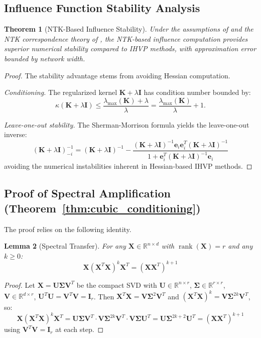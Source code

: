 \documentclass{article}
\theoremstyle{plain}
\newtheorem{theorem}{Theorem}[section]
\newtheorem{lemma}[theorem]{Lemma}
\theoremstyle{definition}
\theoremstyle{remark}
\newcommand{\R}{\mathbb{R}}
\begin{document}
\subsection{Influence Function Stability Analysis}

\begin{theorem}[NTK-Based Influence Stability]
Under the assumptions of \citet{zhang2022rethinking} and the NTK correspondence theory of \citet{jacot2018neural,lee2019wide}, the NTK-based influence computation provides superior numerical stability compared to IHVP methods, with approximation error bounded by network width.
\end{theorem}

\begin{proof}
The stability advantage stems from avoiding Hessian computation.

\textit{Conditioning.} The regularized kernel $\mathbf{K} + \lambda \mathbf{I}$ has condition number bounded by:
$$\kappa(\mathbf{K} + \lambda \mathbf{I}) \leq \frac{\lambda_{\max}(\mathbf{K}) + \lambda}{\lambda} = \frac{\lambda_{\max}(\mathbf{K})}{\lambda} + 1.$$

\textit{Leave-one-out stability.} The Sherman-Morrison formula yields the leave-one-out inverse:
$$(\mathbf{K} + \lambda \mathbf{I})^{-1}_{-i} = (\mathbf{K} + \lambda \mathbf{I})^{-1} - \frac{(\mathbf{K} + \lambda \mathbf{I})^{-1} \mathbf{e}_i \mathbf{e}_i^T (\mathbf{K} + \lambda \mathbf{I})^{-1}}{1 + \mathbf{e}_i^T (\mathbf{K} + \lambda \mathbf{I})^{-1} \mathbf{e}_i}$$
avoiding the numerical instabilities inherent in Hessian-based IHVP methods.
\end{proof}

\subsection{Proof of Spectral Amplification (Theorem~\ref{thm:cubic_conditioning})}

The proof relies on the following identity.

\begin{lemma}[Spectral Transfer]
\label{lem:spectral_transfer}
For any $\mathbf{X} \in \R^{n \times d}$ with $\operatorname{rank}(\mathbf{X}) = r$ and any $k \geq 0$:
$$\mathbf{X}(\mathbf{X}^T\mathbf{X})^k\mathbf{X}^T = (\mathbf{X}\mathbf{X}^T)^{k+1}$$
\end{lemma}

\begin{proof}
Let $\mathbf{X} = \mathbf{U}\boldsymbol{\Sigma}\mathbf{V}^T$ be the compact SVD with $\mathbf{U} \in \R^{n \times r}$, $\boldsymbol{\Sigma} \in \R^{r \times r}$, $\mathbf{V} \in \R^{d \times r}$, $\mathbf{U}^T\mathbf{U} = \mathbf{V}^T\mathbf{V} = \mathbf{I}_r$. Then $\mathbf{X}^T\mathbf{X} = \mathbf{V}\boldsymbol{\Sigma}^2\mathbf{V}^T$ and $(\mathbf{X}^T\mathbf{X})^k = \mathbf{V}\boldsymbol{\Sigma}^{2k}\mathbf{V}^T$, so:
$$\mathbf{X}(\mathbf{X}^T\mathbf{X})^k\mathbf{X}^T = \mathbf{U}\boldsymbol{\Sigma}\mathbf{V}^T \cdot \mathbf{V}\boldsymbol{\Sigma}^{2k}\mathbf{V}^T \cdot \mathbf{V}\boldsymbol{\Sigma}\mathbf{U}^T = \mathbf{U}\boldsymbol{\Sigma}^{2k+2}\mathbf{U}^T = (\mathbf{X}\mathbf{X}^T)^{k+1}$$
using $\mathbf{V}^T\mathbf{V} = \mathbf{I}_r$ at each step.
\end{proof}
\end{document}
